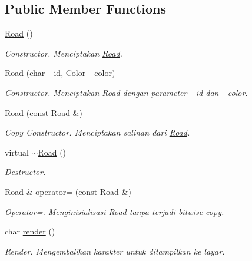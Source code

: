 \subsection*{Public Member Functions}
\begin{DoxyCompactItemize}
\item 
\hyperlink{classRoad_a90bb6be2a5c3b6997849a915e2af0cf0}{Road} ()
\begin{DoxyCompactList}\small\item\em Constructor. Menciptakan \hyperlink{classRoad}{Road}. \end{DoxyCompactList}\item 
\hyperlink{classRoad_a91233046ec07fb84ebd9864dfeef340e}{Road} (char \+\_\+id, \hyperlink{color_8h_ab87bacfdad76e61b9412d7124be44c1c}{Color} \+\_\+color)
\begin{DoxyCompactList}\small\item\em Constructor. Menciptakan \hyperlink{classRoad}{Road} dengan parameter \+\_\+id dan \+\_\+color. \end{DoxyCompactList}\item 
\hyperlink{classRoad_aa3071c703c996ca10117c265dd151b03}{Road} (const \hyperlink{classRoad}{Road} \&)
\begin{DoxyCompactList}\small\item\em Copy Constructor. Menciptakan salinan dari \hyperlink{classRoad}{Road}. \end{DoxyCompactList}\item 
virtual \hyperlink{classRoad_a3fa0feda8a96c3763d5f5a1f06f2972e}{$\sim$\+Road} ()
\begin{DoxyCompactList}\small\item\em Destructor. \end{DoxyCompactList}\item 
\hyperlink{classRoad}{Road} \& \hyperlink{classRoad_ac75dba35f2699126aabf59aca8728288}{operator=} (const \hyperlink{classRoad}{Road} \&)
\begin{DoxyCompactList}\small\item\em Operator=. Menginisialisasi \hyperlink{classRoad}{Road} tanpa terjadi bitwise copy. \end{DoxyCompactList}\item 
char \hyperlink{classRoad_ac85e0bc6f4e956622724401f14bf7ac4}{render} ()
\begin{DoxyCompactList}\small\item\em Render. Mengembalikan karakter untuk ditampilkan ke layar. \end{DoxyCompactList}\item 

\end{DoxyCompactItemize}
